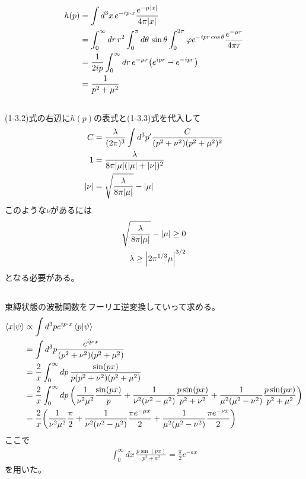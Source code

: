 \documentclass[../../master.tex]{subfiles}
\begin{document}
\subsection{}
\begin{align}
    h(p)
    &= \int d^3x\, e^{-ip\cdot x} \frac{e^{-\mu\abs{x}}}{4\pi\abs{x}}\\
    &= \int_0^\infty dr\,r^2 \int_{0}^{\pi} d\theta \,\sin\theta \int_{0}^{2\pi}\varphi
        e^{-ipr\cos\theta}\frac{e^{-\mu r}}{4\pi r}\\
    &= \frac{1}{2ip} \int_{0}^{\infty}dr\, e^{-\mu r}\qty(e^{ipr}-e^{-ipr})\\
    &= \frac{1}{p^2+\mu^2}
\end{align}

\subsection{}
(1-3.2)式の右辺に\(h(p)\)の表式と(1-3.3)式を代入して
\begin{align}
    C &= \frac{\lambda}{(2\pi)^3}\int d^3p' \frac{C}{(p^2+\nu^2)(p^2+\mu^2)^2}\\
    1 &= \frac{\lambda}{8\pi\abs{\mu}(\abs{\mu}+\abs{\nu})^2}\\
    \abs{\nu} &= \sqrt{\frac{\lambda}{8\pi\abs{\mu}}}-\abs{\mu}
\end{align}
このような\(\nu\)があるには
\begin{align}
    \sqrt{\frac{\lambda}{8\pi\abs{\mu}}}-\abs{\mu} \geq 0\\
    \lambda \geq \abs{2\pi^{1/3}\mu}^{3/2}
\end{align}
となる必要がある。

\subsection{}
束縛状態の波動関数をフーリエ逆変換していって求める。
\begin{align}
    \braket{x}{\psi}
    &\propto \int d^3 p e^{ip\cdot x} \braket{p}{\psi}\\
    &= \int d^3 p \frac{e^{ip\cdot x}}{(p^2+\nu^2)(p^2+\mu^2)}\\
    &= \frac{2}{x}\int_{0}^{\infty} dp\, \frac{\sin(px)}{p(p^2+\nu^2)(p^2+\mu^2)}\\
    &= \frac{2}{x}\int_{0}^{\infty} dp\, \qty(
        \frac{1}{\nu^2\mu^2}\frac{\sin(px)}{p}
        +\frac{1}{\nu^2(\nu^2-\mu^2)}\frac{p\sin(px)}{p^2+\nu^2}
        +\frac{1}{\mu^2(\mu^2-\nu^2)}\frac{p\sin(px)}{p^2+\mu^2})\\
    &= \frac{2}{x}\qty(
        \frac{1}{\nu^2\mu^2}\frac{\pi}{2}
        +\frac{1}{\nu^2(\nu^2-\mu^2)}\frac{\pi e^{-\mu x}}{2}
        +\frac{1}{\mu^2(\mu^2-\nu^2)}\frac{\pi e^{-\nu x}}{2})
\end{align}
ここで
\begin{align}
    \int_{0}^{\infty}dx\, \frac{p\sin(px)}{p^2+a^2} = \frac{\pi}{2}e^{-ax}
\end{align}
を用いた。
\end{document}
